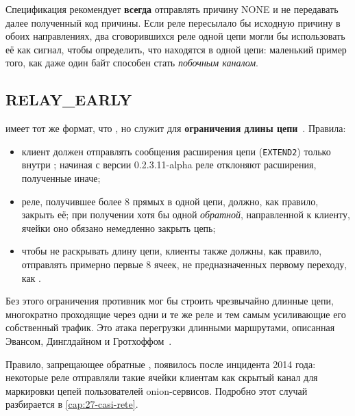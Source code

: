 \begin{attenzione}
Спецификация рекомендует \textbf{всегда} отправлять причину NONE и не передавать далее полученный код причины. Если реле пересылало бы исходную причину в обоих направлениях, два сговорившихся реле одной цепи могли бы использовать её как сигнал, чтобы определить, что находятся в одной цепи: маленький пример того, как даже один байт способен стать \emph{побочным каналом}.
\end{attenzione}

\subsection{RELAY\_EARLY}

 имеет тот же формат, что , но служит для \textbf{ограничения длины цепи}~. Правила:
\begin{itemize}
  \item клиент должен отправлять сообщения расширения цепи (\texttt{EXTEND2}) только внутри ; начиная с версии 0.2.3.11-alpha реле отклоняют расширения, полученные иначе;
  \item реле, получившее более 8 прямых  в одной цепи, должно, как правило, закрыть её; при получении хотя бы одной \emph{обратной}, направленной к клиенту, ячейки оно обязано немедленно закрыть цепь;
  \item чтобы не раскрывать длину цепи, клиенты также должны, как правило, отправлять примерно первые 8 ячеек, не предназначенных первому переходу, как .
\end{itemize}
Без этого ограничения противник мог бы строить чрезвычайно длинные цепи, многократно проходящие через одни и те же реле и тем самым усиливающие его собственный трафик. Это атака перегрузки длинными маршрутами, описанная Эвансом, Динглдайном и Гротхоффом~\cite{evans2009congestion}.

\begin{storia}
Правило, запрещающее обратные , появилось после инцидента 2014 года: некоторые реле отправляли такие ячейки клиентам как скрытый канал для маркировки цепей пользователей onion-сервисов. Подробно этот случай разбирается в \cref{cap:27-casi-rete}.
\end{storia}


